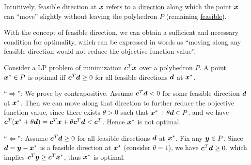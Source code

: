 \begin{enumerate}
Intuitively, feasible direction at \(\bm{x}\) refers to a
\underline{direction} along which the point \(\bm{x}\) can ``move'' slightly
without leaving the polyhedron \(P\) (remaining \underline{feasible}).
\begin{center}
\end{center}
With the concept of feasible direction, we can obtain a sufficient and
necessary condition for optimality, which can be expressed in words as ``moving
along any feasible direction would not reduce the objective function
value''.
\begin{proposition}
\label{prp:optimal-iff-nonneg-feas-dir}
Consider a LP problem of minimization \(\bm{c}^{T}\bm{x}\) over a
polyhedron \(P\).  A point \(\bm{x}^*\in P\) is optimal iff
\(\bm{c}^{T}\bm{d}\ge 0\) for all feasible directions \(\bm{d}\) at
\(\bm{x}^*\).
\end{proposition}
\begin{pf}
``\(\Rightarrow\)'': We prove by contrapositive. Assume
\(\bm{c}^{T}\bm{d}<0\) for some feasible direction \(\bm{d}\) at
\(\bm{x}^*\). Then we can move along that direction to further reduce the
objective function value, since there exists \(\theta>0\) such that
\(\bm{x}^*+\theta\bm{d}\in P\), and we have \(\bm{c}^{T}(\bm{x}^*+\theta\bm{d})
=\bm{c}^{T}\bm{x}+\theta\bm{c}^{T}\bm{d}<\bm{c}^{T}\). Hence
\(\bm{x}^*\) is not optimal.

``\(\Leftarrow\)'': Assume \(\bm{c}^{T}\bm{d}\ge 0\) for all feasible
directions \(\bm{d}\) at \(\bm{x}^*\). Fix any \(\bm{y}\in P\).
Since \(\bm{d}=\bm{y}-\bm{x}^*\) is a feasible direction at
\(\bm{x}^*\) (consider \(\theta=1\)), we have \(\bm{c}^{T}\bm{d}\ge 0\),
which implies \(\bm{c}^{T}\bm{y}\ge\bm{c}^{T}\bm{x}^*\), thus
\(\bm{x}^*\) is optimal.
\end{pf}


\end{enumerate}

